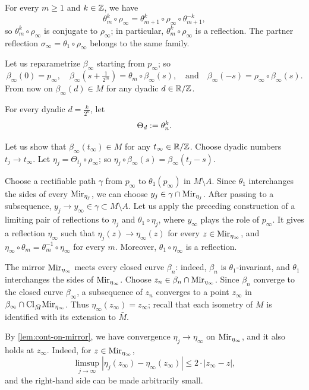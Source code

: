\documentclass[a4paper,10pt]{article}
\begin{document}
For every $m\geqslant1$ and $k\in\mathbb{Z}$, we have
\[
\theta_m^k\circ\rho_\infty
=
\theta_{m+1}^k\circ\rho_\infty\circ\theta_{m+1}^{-k},
\]
so $\theta_m^k\circ\rho_\infty$ is conjugate to $\rho_\infty$;
in particular, $\theta_m^k\circ\rho_\infty$ is a reflection.
The partner reflection $\sigma_\infty=\theta_1\circ\rho_\infty$ belongs to the same family.

Let us reparametrize $\beta_\infty$ starting from $p_\infty$;
so
\[
\beta_\infty(0)=p_\infty,
\quad
\beta_\infty(s+\tfrac1{2^{m}})=\theta_m\circ\beta_\infty(s),
\quad\text{and}\quad
\beta_\infty(-s)=\rho_\infty\circ\beta_\infty(s).
\]
From now on $\beta_\infty(d)\in M$ for any dyadic $d\in\mathbb{R}/\mathbb{Z}$.

For every dyadic $d=\tfrac k{2^n}$, let
\[\Theta_d\mathrel{{:}{=}}\theta_n^k.\]

Let us show that $\beta_\infty(t_\infty)\in M$ for any $t_\infty\in\mathbb{R}/\mathbb{Z}$.
Choose dyadic numbers $t_j\to t_\infty$.
Let $\eta_j=\Theta_{t_j}\circ\rho_\infty$; so $\eta_j\circ\beta_\infty(s)=\beta_\infty(t_j-s)$.

Choose a rectifiable path $\gamma$ from $p_\infty$ to $\theta_1(p_\infty)$ in $M\setminus A$.
Since $\theta_1$ interchanges the sides of every $\mathrm{Mir}_{\eta_j}$, we can choose $y_j\in\gamma\cap\mathrm{Mir}_{\eta_j}$.
After passing to a subsequence, $y_j\to y_\infty\in\gamma\subset M\setminus A$.
Let us apply the preceding construction of a limiting pair of reflections to $\eta_j$ and $\theta_1\circ\eta_j$,
where $y_\infty$ plays the role of $p_\infty$.
It gives a reflection $\eta_\infty$ such that $\eta_j(z)\to\eta_\infty(z)$
for every $z\in\mathrm{Mir}_{\eta_\infty}$, and $\eta_\infty\circ\theta_m=\theta_m^{-1}\circ\eta_\infty$ for every $m$.
Moreover, $\theta_1\circ\eta_\infty$ is a reflection.

The mirror $\mathrm{Mir}_{\eta_\infty}$ meets every closed curve $\beta_n$:
indeed, $\beta_n$ is $\theta_1$-invariant,
and $\theta_1$ interchanges the sides of $\mathrm{Mir}_{\eta_\infty}$.
Choose $z_n\in\beta_n\cap\mathrm{Mir}_{\eta_\infty}$.
Since $\beta_n$ converge to the closed curve $\beta_\infty$, a subsequence of $z_n$ converges to a point $z_\infty$ in $\beta_\infty\cap\mathrm{Cl}_{\bar M}\mathrm{Mir}_{\eta_\infty}$.
Thus $\eta_\infty(z_\infty)=z_\infty$; recall that each isometry of $M$ is identified with its extension to $\bar M$.

By \ref{lem:cont-on-mirror}, we have convergence $\eta_j\to\eta_\infty$ on $\mathrm{Mir}_{\eta_\infty}$,
and it also holds at $z_\infty$.
Indeed, for $z\in\mathrm{Mir}_{\eta_\infty}$,
\[
\limsup_{j\to\infty}|\eta_j(z_\infty)-\eta_\infty(z_\infty)|
\leqslant 2\cdot|z_\infty-z|,
\]
and the right-hand side can be made arbitrarily small.
\end{document}
